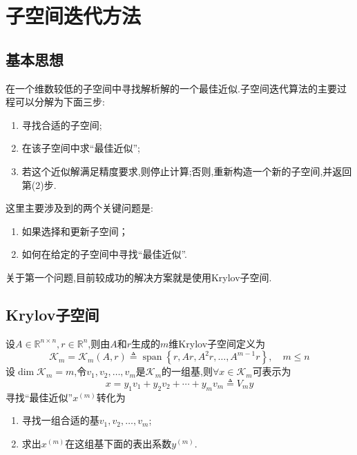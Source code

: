 \documentclass[12pt,a4paper]{article}
\begin{document}
\section*{子空间迭代方法}
\subsection*{基本思想}
在一个{\color{blue}维数较低的子空间}中寻找解析解的一个{\color{blue}最佳近似}.子空间迭代算法的主要过程可以分解为下面三步:
\begin{enumerate}[(1)]
	\item 寻找合适的子空间;\\
	\item 在该子空间中求“最佳近似”;\\
	\item 若这个近似解满足精度要求,则停止计算;否则,重新构造一个新的子空间,并返回第(2)步.
\end{enumerate}
这里主要涉及到的{\color{blue}两个关键问题}是:
\begin{enumerate}
	\item 如果选择和更新子空间；
	\item 如何在给定的子空间中寻找“最佳近似”.
\end{enumerate}
关于第一个问题,目前较成功的解决方案就是使用{\color{blue}Krylov子空间}.\\
\subsection{\color{blue}Krylov子空间}
设$A \in \mathbb{R}^{n \times n}, r \in \mathbb{R}^{n}$,则由$A$和$r$生成的$m$维{\color{blue}Krylov子空间}定义为
$$
\boxed{\mathcal{K}_{m}=\mathcal{K}_{m}(A, r) \triangleq \operatorname{span}\left\{r, A r, A^{2} r, \ldots, A^{m-1} r\right\}, \quad m \leq n}
$$
设$\operatorname{dim} \mathcal{K}_{m}=m$,令$v_{1}, v_{2}, \ldots, v_{m}$是$\mathcal{K}_{m}$的一组基,则$\forall x \in \mathcal{K}_{m}$可表示为
$$x=y_{1} v_{1}+y_{2} v_{2}+\cdots+y_{m} v_{m} \triangleq V_{m} y$$
{\color{blue}寻找“最佳近似”$x^{(m)}$}转化为
\begin{enumerate}
	\item 寻找一组合适的基$v_{1}, v_{2}, \ldots, v_{m}$;
	\item 求出$x^{(m)}$在这组基下面的表出系数$y^{(m)}$.
\end{enumerate}
\end{document}
